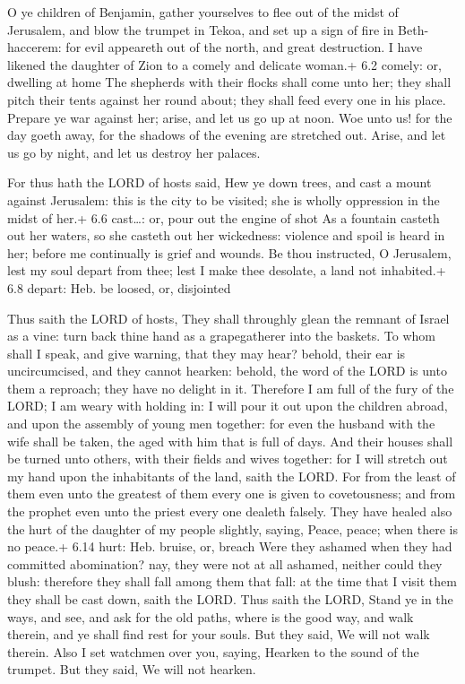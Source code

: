  O ye children of Benjamin, gather yourselves to flee out of
the midst of Jerusalem, and blow the trumpet in Tekoa, and set up a sign
of fire in Beth-haccerem: for evil appeareth out of the north, and great
destruction.  I have likened the daughter of Zion to a
comely and delicate woman.+ 6.2 comely: or, dwelling at home
 The shepherds with their flocks shall come unto her; they
shall pitch their tents against her round about; they shall feed every
one in his place.  Prepare ye war against her; arise, and
let us go up at noon. Woe unto us! for the day goeth away, for the
shadows of the evening are stretched out.  Arise, and let us
go by night, and let us destroy her palaces.

 For thus hath the LORD of hosts said, Hew ye down trees,
and cast a mount against Jerusalem: this is the city to be visited; she
is wholly oppression in the midst of her.+ 6.6 cast\ldots: or, pour out
the engine of shot  As a fountain casteth out her waters, so
she casteth out her wickedness: violence and spoil is heard in her;
before me continually is grief and wounds.  Be thou
instructed, O Jerusalem, lest my soul depart from thee; lest I make thee
desolate, a land not inhabited.+ 6.8 depart: Heb. be loosed, or,
disjointed

 Thus saith the LORD of hosts, They shall throughly glean
the remnant of Israel as a vine: turn back thine hand as a grapegatherer
into the baskets.  To whom shall I speak, and give warning,
that they may hear? behold, their ear is uncircumcised, and they cannot
hearken: behold, the word of the LORD is unto them a reproach; they have
no delight in it.  Therefore I am full of the fury of the
LORD; I am weary with holding in: I will pour it out upon the children
abroad, and upon the assembly of young men together: for even the
husband with the wife shall be taken, the aged with him that is full of
days.  And their houses shall be turned unto others, with
their fields and wives together: for I will stretch out my hand upon the
inhabitants of the land, saith the LORD.  For from the
least of them even unto the greatest of them every one is given to
covetousness; and from the prophet even unto the priest every one
dealeth falsely.  They have healed also the hurt of the
daughter of my people slightly, saying, Peace, peace; when there is no
peace.+ 6.14 hurt: Heb. bruise, or, breach  Were they
ashamed when they had committed abomination? nay, they were not at all
ashamed, neither could they blush: therefore they shall fall among them
that fall: at the time that I visit them they shall be cast down, saith
the LORD.  Thus saith the LORD, Stand ye in the ways, and
see, and ask for the old paths, where is the good way, and walk therein,
and ye shall find rest for your souls. But they said, We will not walk
therein.  Also I set watchmen over you, saying, Hearken to
the sound of the trumpet. But they said, We will not hearken.

